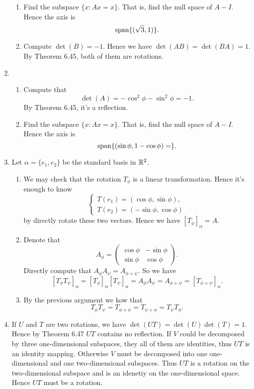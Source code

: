 \begin{enumerate}
\begin{enumerate}
\item Find the subspace $\{x:Ax=x\}$. That is, find the null space of $A-I$. Hence the axis is 
\[\sp\{(\sqrt{3},1)\}.\]
\item Compute $\det(B)=-1$. Hence we have $\det(AB)=\det(BA)=1$. By Theorem 6.45, both of them are rotations.
\end{enumerate}
\item \begin{enumerate}
\item Compute that 
\[\det(A)=-\cos^2 \phi -\sin^2 \phi =-1.\]
By Theorem 6.45, it's a reflection.
\item Find the subspace $\{x:Ax=x\}$. That is, find the null space of $A-I$. Hence the axis is 
\[\sp\{(\sin \phi,1-\cos\phi )=\}.\]
\end{enumerate}
\item Let $\alpha=\{e_1,e_2\}$ be the standard basis in $\R^2$. 
\begin{enumerate}
\item We may check that the rotation $T_{\phi}$ is a linear transformation. Hence it's enough to know 
\[\left\{\begin{array}{l}T(e_1)=(\cos \phi, \sin \phi),\\T(e_2)=(-\sin \phi,\cos \phi)\end{array}\right.\]
by directly rotate these two vectors. Hence we have $[T_{\phi}]_{\alpha}=A$.
\item Denote that 
\[A_{\phi}=\begin{pmatrix}\cos \phi&-\sin\phi\\\sin\phi&\cos\phi\end{pmatrix}.\]
Directly compute that $A_{\phi}A_{\psi}=A_{\phi+\psi}$. So we have 
\[[T_{\phi}T_{\psi}]_{\alpha}=[T_{\phi}]_{\alpha}[T_{\psi}]_{\alpha}=A_{\phi}A_{\psi}=A_{\phi+\psi}=[T_{\phi+\psi}]_{\alpha}.\]
\item By the previous argument we kow that 
\[T_{\phi}T_{\psi}=T_{\phi+\psi}=T_{\psi+\phi}=T_{\psi}T_{\phi}.\]
\end{enumerate}
\item If $U$ and $T$ are two rotations, we have $\det(UT)=\det(U)\det(T)=1$. Hence by Theorem 6.47 $UT$ contains no reflection. If $V$ could be decomposed by three one-dimensional subspaces, they all of them are identities, thus $UT$ is an identity mapping. Otherwise $V$ must be decomposed into one one-dimensional and one two-dimensional subspaces. Thus $UT$ is a rotation on the two-dimensional subspace and is an idenetiy on the one-dimensional space. Hence $UT$ must be a rotation.

\end{enumerate}
